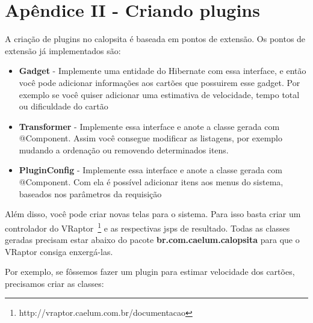 \section{Apêndice II - Criando plugins}

A criação de plugins no calopsita é baseada em pontos de extensão. Os pontos de extensão já implementados são:

\begin{itemize}
	\item{\textbf{Gadget} - Implemente uma entidade do Hibernate com essa interface, e então você pode adicionar informações
		aos cartões que possuirem esse gadget. Por exemplo se você quiser adicionar uma estimativa de velocidade, tempo total 
		ou dificuldade do cartão}
	\item{\textbf{Transformer} - Implemente essa interface e anote a classe gerada com @Component. Assim você consegue
		modificar as listagens, por exemplo mudando a ordenação ou removendo determinados itens.}
	\item{\textbf{PluginConfig} - Implemente essa interface e anote a classe gerada com @Component. Com ela é possível
		adicionar itens aos menus do sistema, baseados nos parâmetros da requisição}
\end{itemize}

Além disso, você pode criar novas telas para o sistema. Para isso basta criar um controlador do 
VRaptor~\footnote{http://vraptor.caelum.com.br/documentacao} e as respectivas jsps de resultado.
Todas as classes geradas precisam estar abaixo do pacote \textbf{br.com.caelum.calopsita} para que o
VRaptor consiga enxergá-las.

Por exemplo, se fôssemos fazer um plugin para estimar velocidade dos cartões, precisamos criar as classes:


